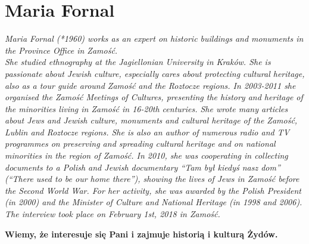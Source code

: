 \section{Maria Fornal}

\textit{Maria Fornal (*1960) works as an expert on historic buildings and monuments in the Province Office in Zamość. \\
She studied ethnography at the Jagiellonian University in Kraków. She is passionate about Jewish culture, especially cares about protecting cultural heritage, also as a tour guide around Zamość and the Roztocze regions. In 2003-2011 she organised the Zamość Meetings of Cultures, presenting the history and heritage of the minorities living in Zamość in 16-20th centuries. She wrote many articles about Jews and Jewish culture, monuments and cultural heritage of the Zamość, Lublin and Roztocze regions. She is also an author of numerous radio and TV programmes on preserving and spreading cultural heritage and on national minorities in the region of Zamość. In 2010, she was cooperating in collecting documents to a Polish and Jewish documentary ``Tam był kiedyś nasz dom'' (``There used to be our home there''), showing the lives of Jews in Zamość before the Second World War. For her activity, she was awarded by the Polish President (in 2000) and the Minister of Culture and National Heritage (in 1998 and 2006). \\
The interview took place on February 1st, 2018 in Zamość.}\par
\vspace*{2em}
\textbf{Wiemy, że interesuje się Pani i zajmuje historią i kulturą Żydów.}
	
